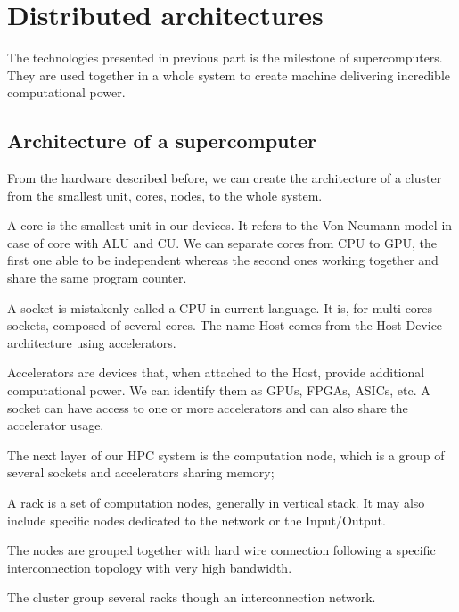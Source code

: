 \section{Distributed architectures}

The technologies presented in previous part is the milestone of supercomputers. 
They are used together in a whole system to create machine delivering incredible computational power.

\subsection{Architecture of a supercomputer}
From the hardware described before, we can create the architecture of a cluster from the smallest unit, cores, nodes, to the whole system.

\begin{description}
\item[Core:] A core is the smallest unit in our devices. 
It refers to the Von Neumann model in case of core with ALU and CU. 
We can separate cores from CPU to GPU, the first one able to be independent whereas the second ones working together and share the same program counter. 
\item[Socket/Host:] A socket is mistakenly called a CPU in current language. 
It is, for multi-cores sockets, composed of several cores. 
The name Host comes from the Host-Device architecture using accelerators. 
\item[Accelerators/Devices:] Accelerators are devices that, when attached to the Host, provide additional computational power. 
We can identify them as GPUs, FPGAs, ASICs, etc. 
A socket can have access to one or more accelerators and can also share the accelerator usage. 
\item[Computation node: ] The next layer of our HPC system is the computation node, which is a group of several sockets and accelerators sharing memory;
\item[Rack: ] A rack is a set of computation nodes, generally in vertical stack. 
It may also include specific nodes dedicated to the network or the Input/Output.
\item[Interconnection: ] The nodes are grouped together with hard wire connection following a specific interconnection topology with very high bandwidth.
\item[System/Cluster/Supercomputer] The cluster group several racks though an interconnection network.
\end{description}


